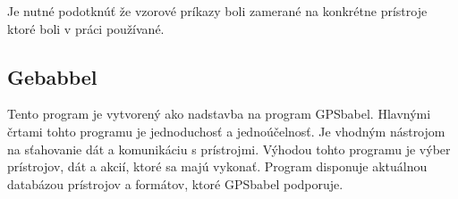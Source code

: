 Je nutné podotknúť že vzorové príkazy boli zamerané na konkrétne prístroje ktoré boli v práci používané.

\subsection{Gebabbel}
Tento program je vytvorený ako nadstavba na program GPSbabel. Hlavnými črtami tohto programu je jednoduchosť a jednoúčelnosť. Je vhodným nástrojom na sťahovanie dát a komunikáciu s prístrojmi. Výhodou tohto programu je výber prístrojov, dát a akcií, ktoré sa majú vykonať. Program disponuje aktuálnou databázou prístrojov a formátov, ktoré GPSbabel podporuje.
